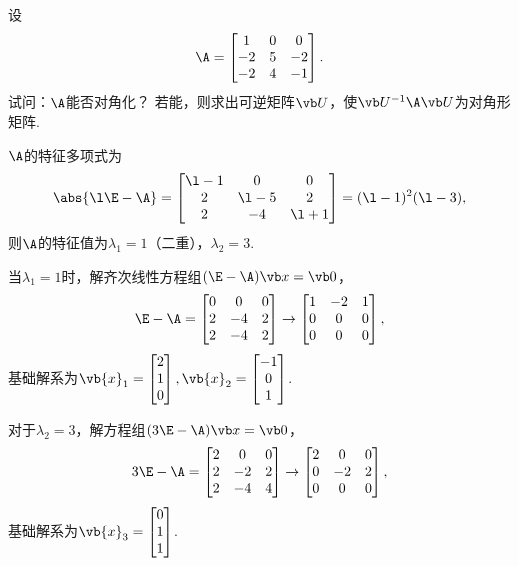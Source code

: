 \begin{example}
设\[
	\A = \begin{bmatrix}
		1 & 0 & 0 \\
		-2 & 5 & -2 \\
		-2 & 4 & -1
	\end{bmatrix}.
\]
试问：\(\A\)能否对角化？
若能，则求出可逆矩阵\(\P\)，使\(\P^{-1}\A\P\)为对角形矩阵.
\begin{solution}
\(\A\)的特征多项式为\[
	\abs{\l\E-\A} = \begin{bmatrix}
		\l-1 & 0 & 0 \\
		2 & \l-5 & 2 \\
		2 & -4 & \l+1
	\end{bmatrix}
	= (\l-1)^2 (\l-3),
\]
则\(\A\)的特征值为\(\lambda_1=1\)（二重），\(\lambda_2=3\).

当\(\lambda_1=1\)时，解齐次线性方程组\((\E-\A)\x=\vb0\)，\[
	\E-\A=\begin{bmatrix}
		0 & 0 & 0 \\
		2 & -4 & 2 \\
		2 & -4 & 2
	\end{bmatrix}
	\to \begin{bmatrix}
		1 & -2 & 1 \\
		0 & 0 & 0 \\
		0 & 0 & 0
	\end{bmatrix},
\]
基础解系为\(\vb{x}_1 = \begin{bmatrix} 2 \\ 1 \\ 0 \end{bmatrix},
\vb{x}_2 = \begin{bmatrix} -1 \\ 0 \\ 1 \end{bmatrix}\).

对于\(\lambda_2=3\)，解方程组\((3\E-\A)\x=\vb0\)，\[
	3\E-\A=\begin{bmatrix}
		2 & 0 & 0 \\
		2 & -2 & 2 \\
		2 & -4 & 4
	\end{bmatrix} \to \begin{bmatrix}
		2 & 0 & 0 \\
		0 & -2 & 2 \\
		0 & 0 & 0
	\end{bmatrix},
\]
基础解系为\(\vb{x}_3 = \begin{bmatrix} 0 \\ 1 \\ 1 \end{bmatrix}\).


\end{solution}
\end{example}
